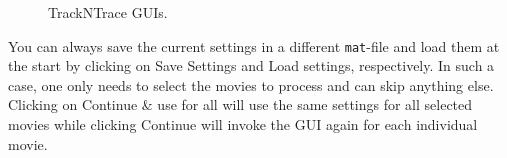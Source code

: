 \documentclass[11pt,onside]{report}
\numberwithin{equation}{chapter}
\begin{document}
\begin{figure}[!h]
\centering
{} \qquad
{}
\caption{TrackNTrace GUIs.}
\end{figure}

You can always save the current settings in a different \texttt{mat}-file and load them at the start by clicking on \textsf{Save Settings} and \textsf{Load settings}, respectively. In such a case, one only needs to select the movies to process and can skip anything else. Clicking on \textsf{Continue \& use for all} will use the same settings for all selected movies while clicking \textsf{Continue} will invoke the GUI again for each individual movie.
\end{document}
